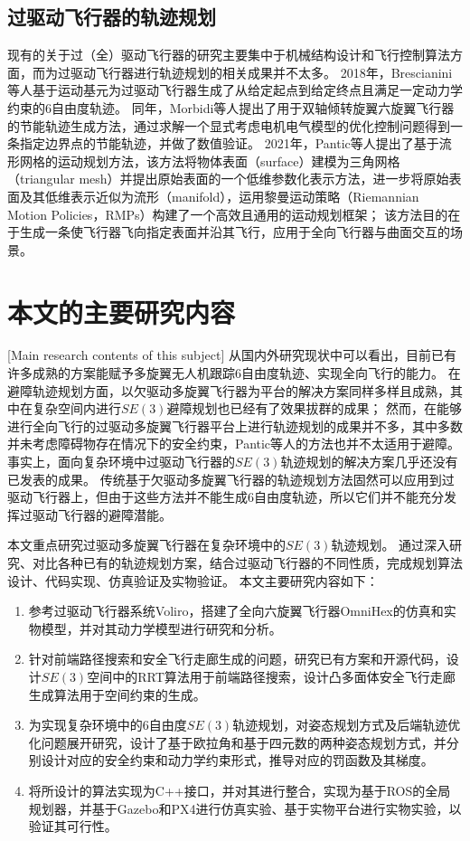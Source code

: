 \subsection{过驱动飞行器的轨迹规划}
现有的关于过（全）驱动飞行器的研究主要集中于机械结构设计和飞行控制算法方面，而为过驱动飞行器进行轨迹规划的相关成果并不太多。
2018年，Brescianini等人基于运动基元为过驱动飞行器生成了从给定起点到给定终点且满足一定动力学约束的6自由度轨迹\cite{brescianini2018computationally}。
同年，Morbidi等人提出了用于双轴倾转旋翼六旋翼飞行器的节能轨迹生成方法\cite{morbidi2018energy}，通过求解一个显式考虑电机电气模型的优化控制问题得到一条指定边界点的节能轨迹，并做了数值验证。
2021年，Pantic等人提出了基于流形网格的运动规划方法\cite{pantic2021mesh}，该方法将物体表面（surface）建模为三角网格（triangular mesh）并提出原始表面的一个低维参数化表示方法，进一步将原始表面及其低维表示近似为流形（manifold），运用黎曼运动策略（Riemannian Motion Policies，RMPs）构建了一个高效且通用的运动规划框架；
该方法目的在于生成一条使飞行器飞向指定表面并沿其飞行，应用于全向飞行器与曲面交互的场景。

\section{本文的主要研究内容}[Main research contents of this subject]
从国内外研究现状中可以看出，目前已有许多成熟的方案能赋予多旋翼无人机跟踪6自由度轨迹、实现全向飞行的能力。
在避障轨迹规划方面，以欠驱动多旋翼飞行器为平台的解决方案同样多样且成熟，其中在复杂空间内进行$SE(3)$避障规划也已经有了效果拔群的成果；
然而，在能够进行全向飞行的过驱动多旋翼飞行器平台上进行轨迹规划的成果并不多，其中多数\cite{brescianini2018computationally, morbidi2018energy}并未考虑障碍物存在情况下的安全约束，Pantic等人的方法\cite{pantic2021mesh}也并不太适用于避障。
事实上，面向复杂环境中过驱动飞行器的$SE(3)$轨迹规划的解决方案几乎还没有已发表的成果。
传统基于欠驱动多旋翼飞行器的轨迹规划方法固然可以应用到过驱动飞行器上，但由于这些方法并不能生成6自由度轨迹，所以它们并不能充分发挥过驱动飞行器的避障潜能。

本文重点研究过驱动多旋翼飞行器在复杂环境中的$SE(3)$轨迹规划。
通过深入研究、对比各种已有的轨迹规划方案，结合过驱动飞行器的不同性质，完成规划算法设计、代码实现、仿真验证及实物验证。
本文主要研究内容如下：
\begin{enumerate}
    \renewcommand{\labelenumi}{(\theenumi)}
    \item 参考过驱动飞行器系统Voliro\cite{kamel2018voliro}，搭建了全向六旋翼飞行器OmniHex的仿真和实物模型，并对其动力学模型进行研究和分析。
    \item 针对前端路径搜索和安全飞行走廊生成的问题，研究已有方案和开源代码，设计$SE(3)$空间中的RRT算法用于前端路径搜索，设计凸多面体安全飞行走廊生成算法用于空间约束的生成。
    \item 为实现复杂环境中的6自由度$SE(3)$轨迹规划，对姿态规划方式及后端轨迹优化问题展开研究，设计了基于欧拉角和基于四元数的两种姿态规划方式，并分别设计对应的安全约束和动力学约束形式，推导对应的罚函数及其梯度。
    \item 将所设计的算法实现为C++接口，并对其进行整合，实现为基于ROS\cite{quigley2009ros}的全局规划器，并基于Gazebo\cite{gazebo}和PX4\cite{meier2015px4}进行仿真实验、基于实物平台进行实物实验，以验证其可行性。
\end{enumerate}

